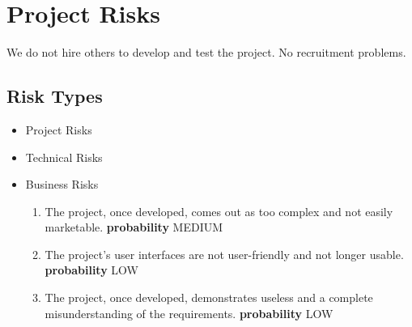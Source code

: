 \section{Project Risks}
We do not hire others to develop and test the project.
No recruitment problems.
%
\subsection{Risk Types}
\begin{itemize}
	\item Project Risks
	\item Technical Risks
	\item Business Risks
	\begin{itemize}
		
		
		
		
		\begin{enumerate}
			\item The project, once developed, comes out as too complex and not easily marketable.\newline
			\textbf{probability} MEDIUM
			\item The project's user interfaces are not user-friendly and not longer usable.\newline
			\textbf{probability} LOW
			\item The project, once developed, demonstrates useless and a complete misunderstanding of the requirements.\newline
			\textbf{probability} LOW
		\end{enumerate}
		

\end{itemize}
\end{itemize}
